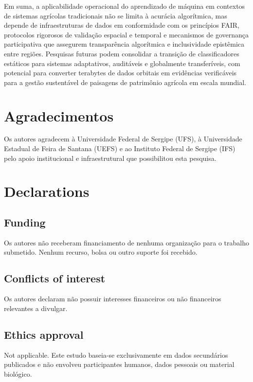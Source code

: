 \documentclass[lineno,pdflatex,sn-apa]{sn-jnl}%
\begin{document}
Em suma, a aplicabilidade operacional do aprendizado de máquina em contextos de sistemas agrícolas tradicionais não se limita à acurácia algorítmica, mas depende de infraestruturas de dados em conformidade com os princípios FAIR, protocolos rigorosos de validação espacial e temporal e mecanismos de governança participativa que assegurem transparência algorítmica e inclusividade epistêmica entre regiões. Pesquisas futuras podem consolidar a transição de classificadores estáticos para sistemas adaptativos, auditáveis e globalmente transferíveis, com potencial para converter terabytes de dados orbitais em evidências verificáveis para a gestão sustentável de paisagens de patrimônio agrícola em escala mundial.

\section*{Agradecimentos}

Os autores agradecem à Universidade Federal de Sergipe (UFS), à Universidade Estadual de Feira de Santana (UEFS) e ao Instituto Federal de Sergipe (IFS) pelo apoio institucional e infraestrutural que possibilitou esta pesquisa.

\section*{Declarations}

\subsection*{Funding}

Os autores não receberam financiamento de nenhuma organização para o trabalho submetido. Nenhum recurso, bolsa ou outro suporte foi recebido.

\subsection*{Conflicts of interest}

Os autores declaram não possuir interesses financeiros ou não financeiros relevantes a divulgar.

\subsection*{Ethics approval}

Not applicable. Este estudo baseia-se exclusivamente em dados secundários publicados e não envolveu participantes humanos, dados pessoais ou material biológico.
\end{document}
